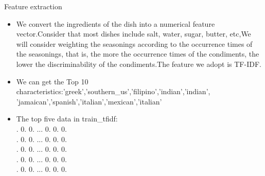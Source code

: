 \documentclass[
 size=14pt,
 paper=smartboard,  %
 mode=present, 		%
 display=slides, 	%
 style=tuliplab,  	%
 pauseslide,
 fleqn,leqno]{powerdot}
\begin{document}
\begin{slide}{Feature extraction}
  \begin{center}
  
  {
    \begin{itemize}
     \item 
      We convert the ingredients of the dish into a numerical feature vector.Consider that most dishes include salt, water, sugar, butter, etc,We will consider weighting the seasonings according to the occurrence times of the seasonings, that is, the more the occurrence times of the condiments, the lower the discriminability of the condiments.The feature we adopt is TF-IDF.\\
     \item
      We can get the Top 10 characteristics:\lbrack'greek','southern\_us','filipino','indian','indian',\\
      'jamaican','spanish','italian','mexican','italian'\rbrack
     \item The top five data in train\_tfidf:\\
     \lbrack{}. 0. 0. ... 0. 0. 0.\rbrack\\
     . 0. 0. ... 0. 0. 0.\rbrack\\
     . 0. 0. ... 0. 0. 0.\rbrack\\
     . 0. 0. ... 0. 0. 0.\rbrack\\
     . 0. 0. ... 0. 0. 0.\rbrack\rbrack
    \end{itemize}
  }
  
  \end{center}
  \bigskip
  \begin{center}
  
  \end{center}
  \bigskip
  
  
  
  \end{slide}
\end{document}
